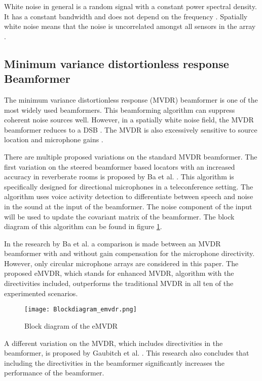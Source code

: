 White noise in general is a random signal with a constant power spectral density. It has a constant bandwidth and does not depend on the frequency \cite{carter2013}. Spatially white noise means that the noise is uncorrelated amongst all sensors in the array \cite{krim1996}.

\subsection{Minimum variance distortionless response Beamformer}
The minimum variance distortionless response (MVDR) beamformer \cite{naylor2010speech} is one of the most widely used beamformers. This beamforming algorithm can suppress coherent noise sources well. However, in a spatially white noise field, the MVDR beamformer reduces to a DSB  \cite{naylor2010speech}. The MVDR is also excessively sensitive to source location and microphone gains \citep{ba2007}.

There are multiple proposed variations on the standard MVDR beamformer. The first variation on the steered beamformer based locators with an increased accuracy in reverberate rooms is proposed by Ba et al. \cite{ba2007}. This algorithm is specifically designed for directional microphones in a teleconference setting. The algorithm uses voice activity detection to differentiate between speech and noise in the sound at the input of the beamformer. The noise component of the input will be used to update the covariant matrix of the beamformer. The block diagram of this algorithm can be found in figure \ref{fig:emvdr}. 

In the research by Ba et al. \cite{ba2007} a comparison is made between an MVDR beamformer with and without gain compensation for the microphone directivity. However, only circular microphone arrays are considered in this paper. The proposed eMVDR, which stands for enhanced MVDR, algorithm with the directivities included, outperforms the traditional MVDR in all ten of the experimented scenarios.
\begin{figure}
	\centering  
	\texttt{[image: Blockdiagram\_emvdr.png]}
	\caption{Block diagram of the eMVDR \cite{ba2007}} 
	\label{fig:emvdr}
\end{figure}
A different variation on the MVDR, which includes directivities in the beamformer, is proposed by Gaubitch et al. \cite{gaubitch2014}. This research also concludes that including the directivities in the beamformer significantly increases the performance of the beamformer. 



